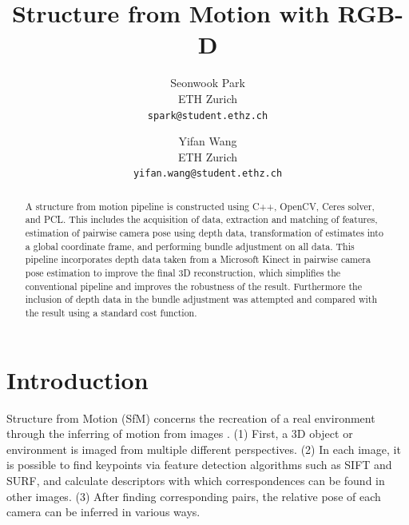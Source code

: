 \documentclass[10pt,twocolumn,letterpaper]{article}
\begin{document}
\title{Structure from Motion with RGB-D}

\author{Seonwook Park \\
ETH Zurich \\
{\tt\small spark@student.ethz.ch}
\and
Yifan Wang \\
ETH Zurich \\
{\tt\small yifan.wang@student.ethz.ch}
}

\maketitle

\begin{abstract}
   A structure from motion pipeline is constructed using C++, OpenCV, Ceres
   solver, and PCL. This includes the acquisition of data, extraction and
   matching of features, estimation of pairwise camera pose using depth data,
   transformation of estimates into a global coordinate frame, and performing
   bundle adjustment on all data. This pipeline incorporates depth data taken
   from a Microsoft Kinect in pairwise camera pose estimation to improve the
   final 3D reconstruction, which simplifies the conventional pipeline and improves the robustness of the result. Furthermore the inclusion of depth data in the bundle adjustment was attempted and compared with the result using a standard cost function.
\end{abstract}

\section{Introduction}

Structure from Motion (SfM) concerns the recreation of a real environment
through the inferring of motion from images \cite{varga2008practical}. (1)
First, a 3D object or environment is imaged from multiple different
perspectives. (2) In each image, it is possible to find keypoints via feature
detection algorithms such as SIFT and SURF, and calculate descriptors with which
correspondences can be found in other images. (3) After finding corresponding
pairs, the relative pose of each camera can be inferred in various ways.
\end{document}
